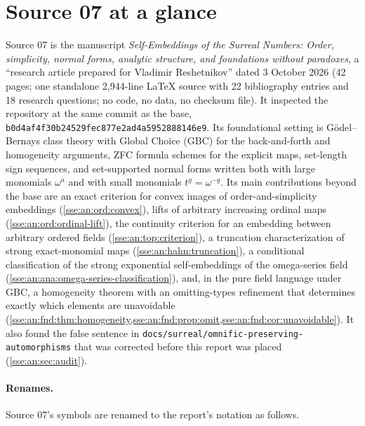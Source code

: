 \documentclass[11pt,a4paper]{article}
\numberwithin{equation}{section}
\theoremstyle{plain}
\theoremstyle{definition}
\theoremstyle{remark}
\newcommand{\code}[1]{\texttt{\small #1}}
\newcommand{\fn}[1]{\nolinkurl{#1}}%
\begin{document}
\section{Source 07 at a glance}\label{sse:an:sec:glance}

Source 07 is the manuscript \emph{Self-Embeddings of the Surreal Numbers:
Order, simplicity, normal forms, analytic structure, and foundations without
paradoxes}, a ``research article prepared for Vladimir Reshetnikov'' dated
3 October 2026 (42 pages; one standalone 2{,}944-line LaTeX source with 22
bibliography entries and 18 research questions; no code, no data, no
checksum file). It inspected the repository at the same commit as the base,
\code{b0d4af4f30b24529fec877e2ad4a5952888146e9}. Its foundational setting is
G\"odel--Bernays class theory with Global Choice (GBC) for the
back-and-forth and homogeneity arguments, ZFC formula schemes for the
explicit maps, set-length sign sequences, and set-supported normal forms
written both with large monomials $\omega^a$ and with small monomials
$t^g=\omega^{-g}$. Its main contributions beyond the base are an exact
criterion for convex images of order-and-simplicity embeddings
(\cref{sse:an:ord:convex}), lifts of arbitrary increasing ordinal maps
(\cref{sse:an:ord:ordinal-lift}), the continuity criterion for an
embedding between arbitrary ordered fields (\cref{sse:an:top:criterion}),
a truncation characterization of strong exact-monomial maps
(\cref{sse:an:hahn:truncation}), a conditional classification of the strong
exponential self-embeddings of the omega-series field
(\cref{sse:an:ana:omega-series-classification}), and, in the pure field
language under GBC, a homogeneity theorem with an omitting-types refinement
that determines exactly which elements are unavoidable
(\cref{sse:an:fnd:thm:homogeneity,sse:an:fnd:prop:omit,sse:an:fnd:cor:unavoidable}).
It also found the false sentence in
\fn{docs/surreal/omnific-preserving-automorphisms} that was corrected
before this report was placed (\cref{sse:an:sec:audit}).

\paragraph{Renames.} Source 07's symbols are renamed to the report's
notation as follows.
\end{document}
